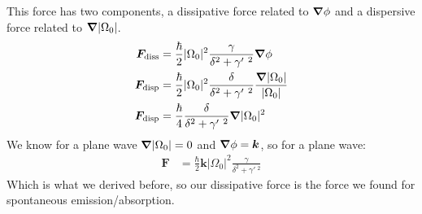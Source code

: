 This force has two components, a dissipative force related to $\bm{\nabla}\phi$ and a dispersive force related to $\bm{\nabla}|\Omega_0|$.
\begin{align*}
	\bm{F}_\text{diss} &= \frac{\hbar}{2}|\Omega_0|^2 \frac{\gamma}{\delta^2 + \gamma'\ ^2}\bm{\nabla}\phi \\
	\bm{F}_\text{disp} &= \frac{\hbar}{2}|\Omega_0|^2 \frac{\delta}{\delta^2 + \gamma'\ ^2}\frac{\bm{\nabla}|\Omega_0|}{|\Omega_0|} \\
	\bm{F}_\text{disp} &= \frac{\hbar}{4} \frac{\delta}{\delta^2 + \gamma'\ ^2}\bm{\nabla} |\Omega_0|^2
\end{align*}
We know for a plane wave $\bm{\nabla}|\Omega_0| = 0$ and $\bm{\nabla}\phi = \bm{k}$, so for a plane wave:
\begin{align*}
	\bm{F} &= \frac{\hbar}{2}\bm{k} |\Omega_0|^2 \frac{\gamma}{\delta^2 + \gamma'\ ^2}
\end{align*}
Which is what we derived before, so our dissipative force is the force we found for spontaneous emission/absorption.

